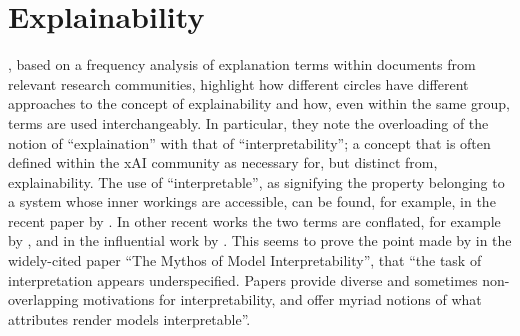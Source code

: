 \section{Explainability} \label{sec:explainability}
\citet{Doran2018}, based on a frequency analysis of explanation terms within documents from relevant research communities, highlight how different circles have different approaches to the concept of explainability and how, even within the same group, terms are used interchangeably.
In particular, they note the overloading of the notion of \enquote{explaination} with that of \enquote{interpretability}; a concept that is often defined within the xAI community as necessary for, but distinct from, explainability.
The use of \enquote{interpretable}, as signifying the property belonging to a system whose inner workings are accessible, can be found, for example, in the recent paper by \citet{gilpin2018explaining}.
In other recent works the two terms are conflated, for example by \citet{mittelstadt2019explaining}, \citet{guidotti2018survey} and in the influential work by \citet{doshi2017towards}.
This seems to prove the point made by \citet{Lipton2016} in the widely-cited paper \enquote{The Mythos of Model Interpretability}, that \enquote{the task of interpretation appears underspecified. Papers provide diverse and sometimes non-overlapping motivations for interpretability, and offer myriad notions of what attributes render models interpretable}.

